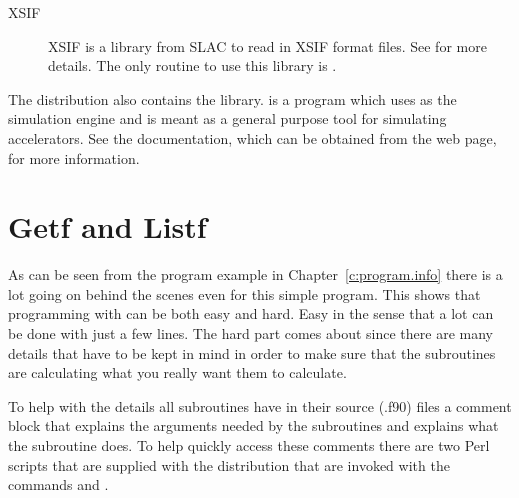 \begin{description}
\item[XSIF] 
XSIF is a library from SLAC to read in XSIF format files. See 
 for more details. The only
\bmad routine to use this library is .

\end{description}

The \bmad distribution also contains the \tao library. \tao is a program 
which uses \bmad as the simulation engine and is meant as a general 
purpose tool for simulating accelerators. See the \tao documentation, which 
can be obtained from the \bmad web page, for more information.

\section{Getf and Listf}
\label{s:getf}

As can be seen from the program example in Chapter~\ref{c:program.info}
there is a lot going on behind the scenes even for this
simple program. This shows that programming with \bmad can be both easy
and hard. Easy in the sense that a lot can be done with just a few
lines. The hard part comes about since there are many details that
have to be kept in mind in order to make sure that the subroutines
are calculating what you really want them to calculate.

To help with the details all \bmad subroutines have in their source (.f90)
files a comment block that explains the arguments needed by the
subroutines and explains what the subroutine does. To help quickly
access these comments there are two Perl scripts that are supplied
with the \bmad distribution that are invoked with the commands
 and .

